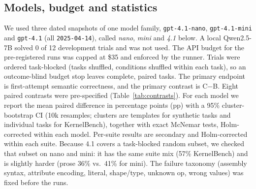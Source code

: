 \subsection{Models, budget and statistics}
We used three dated snapshots of one model family, \texttt{gpt-4.1-nano}, \texttt{gpt-4.1-mini} and \texttt{gpt-4.1} (all \texttt{2025-04-14}), called \emph{nano}, \emph{mini} and \emph{4.1} below. A local Qwen2.5-7B solved 0 of 12 development trials and was not used. The API budget for the pre-registered runs was capped at \$35 and enforced by the runner. Trials were ordered task-blocked (tasks shuffled, conditions shuffled within each task), so an outcome-blind budget stop leaves complete, paired tasks. The primary endpoint is first-attempt semantic correctness, and the primary contrast is C$-$B. Eight paired contrasts were pre-specified (Table~\ref{tab:contrasts}). For each model we report the mean paired difference in percentage points (pp) with a 95\% cluster-bootstrap CI (10k resamples; clusters are templates for synthetic tasks and individual tasks for KernelBench), together with exact McNemar tests, Holm-corrected within each model. Per-suite results are secondary and Holm-corrected within each suite. Because 4.1 covers a task-blocked random subset, we checked that subset on nano and mini: it has the same suite mix (57\% KernelBench) and is slightly harder (prose 36\% vs.\ 41\% for mini). The failure taxonomy (assembly syntax, attribute encoding, literal, shape/type, unknown op, wrong values) was fixed before the runs.
